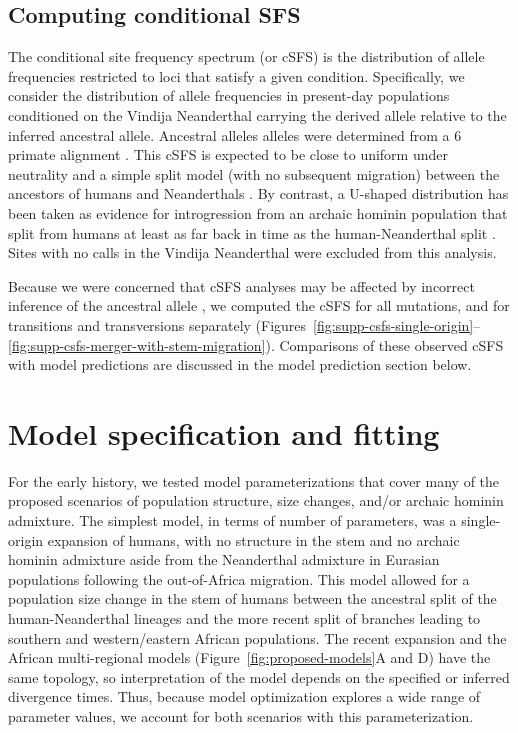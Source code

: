 \documentclass[]{article}
\begin{document}
\subsection{Computing conditional SFS}\label{sec:computing-csfs}

The conditional site frequency spectrum (or cSFS) is the distribution of allele
frequencies restricted to loci that satisfy a given condition. Specifically, we
consider the distribution of allele frequencies in present-day populations
conditioned on the Vindija Neanderthal carrying the derived allele relative to
the inferred ancestral allele. Ancestral alleles alleles were determined from a
6 primate alignment \citep{1000_Genomes_Project_Consortium2015-zq}.
This cSFS is expected to be close to
uniform under neutrality and a simple split model (with no subsequent
migration) between the ancestors of humans and Neanderthals
\citep{Chen2007-iy}. By contrast, a U-shaped distribution has been taken as
evidence for introgression from an archaic hominin population that split
from humans at least as far back in time as the human-Neanderthal split
\citep{Yang2012-ze,Durvasula2020-td}.
Sites with no calls in the Vindija Neanderthal were excluded from
this analysis.

Because we were concerned that cSFS analyses may be affected by incorrect
inference of the ancestral allele \citep{Hernandez2007-mf}, we computed the cSFS
for all mutations, and for transitions and transversions separately
(Figures~\ref{fig:supp-csfs-single-origin}--\ref{fig:supp-csfs-merger-with-stem-migration}).
Comparisons of these observed cSFS with model
predictions are discussed in the model prediction section below. 

\section{Model specification and fitting}
\label{modelspec}

For the early history, we tested model parameterizations that cover many of the
proposed scenarios of population structure, size changes, and/or archaic
hominin admixture. The simplest model, in terms of number of parameters, was a
single-origin expansion of humans, with no structure in the stem and no archaic
hominin admixture aside from the Neanderthal admixture in Eurasian populations
following the out-of-Africa migration. This model allowed for a population size
change in the stem of humans between the ancestral split of the
human-Neanderthal lineages and the more recent split of branches leading to
southern and western/eastern African populations. The recent expansion and the
African multi-regional models (Figure~\ref{fig:proposed-models}A and D) have
the same topology, so interpretation of the model depends on the specified or
inferred divergence times. Thus, because model optimization explores a wide
range of parameter values, we account for both scenarios with this
parameterization.
\end{document}
